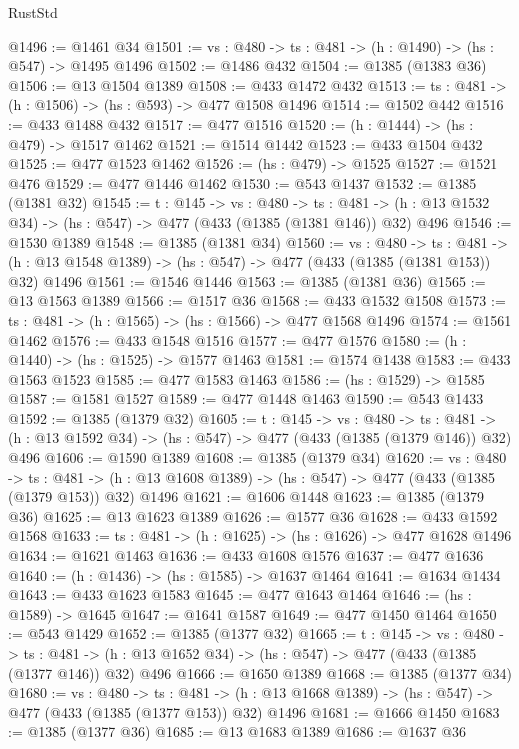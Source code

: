 \begin{lexlean}{RustStd}
\begin{coremodule}
{\begin{coremodule}
{{{{{{{@1496 := @1461 @34
@1501 := {vs : @480} -> {ts : @481} -> (h : @1490) -> (hs : @547) -> @1495 @1496
@1502 := @1486 @432
@1504 := @1385 (@1383 @36)
@1506 := @13 @1504 @1389
@1508 := @433 @1472 @432
@1513 := {ts : @481} -> (h : @1506) -> (hs : @593) -> @477 @1508 @1496
@1514 := @1502 @442
@1516 := @433 @1488 @432
@1517 := @477 @1516
@1520 := (h : @1444) -> (hs : @479) -> @1517 @1462
@1521 := @1514 @1442
@1523 := @433 @1504 @432
@1525 := @477 @1523 @1462
@1526 := (hs : @479) -> @1525
@1527 := @1521 @476
@1529 := @477 @1446 @1462
@1530 := @543 @1437
@1532 := @1385 (@1381 @32)
@1545 := {t : @145} ->
  {vs : @480} ->
  {ts : @481} -> (h : @13 @1532 @34) -> (hs : @547) -> @477 (@433 (@1385 (@1381 @146)) @32) @496
@1546 := @1530 @1389
@1548 := @1385 (@1381 @34)
@1560 := {vs : @480} ->
  {ts : @481} -> (h : @13 @1548 @1389) -> (hs : @547) -> @477 (@433 (@1385 (@1381 @153)) @32) @1496
@1561 := @1546 @1446
@1563 := @1385 (@1381 @36)
@1565 := @13 @1563 @1389
@1566 := @1517 @36
@1568 := @433 @1532 @1508
@1573 := {ts : @481} -> (h : @1565) -> (hs : @1566) -> @477 @1568 @1496
@1574 := @1561 @1462
@1576 := @433 @1548 @1516
@1577 := @477 @1576
@1580 := (h : @1440) -> (hs : @1525) -> @1577 @1463
@1581 := @1574 @1438
@1583 := @433 @1563 @1523
@1585 := @477 @1583 @1463
@1586 := (hs : @1529) -> @1585
@1587 := @1581 @1527
@1589 := @477 @1448 @1463
@1590 := @543 @1433
@1592 := @1385 (@1379 @32)
@1605 := {t : @145} ->
  {vs : @480} ->
  {ts : @481} -> (h : @13 @1592 @34) -> (hs : @547) -> @477 (@433 (@1385 (@1379 @146)) @32) @496
@1606 := @1590 @1389
@1608 := @1385 (@1379 @34)
@1620 := {vs : @480} ->
  {ts : @481} -> (h : @13 @1608 @1389) -> (hs : @547) -> @477 (@433 (@1385 (@1379 @153)) @32) @1496
@1621 := @1606 @1448
@1623 := @1385 (@1379 @36)
@1625 := @13 @1623 @1389
@1626 := @1577 @36
@1628 := @433 @1592 @1568
@1633 := {ts : @481} -> (h : @1625) -> (hs : @1626) -> @477 @1628 @1496
@1634 := @1621 @1463
@1636 := @433 @1608 @1576
@1637 := @477 @1636
@1640 := (h : @1436) -> (hs : @1585) -> @1637 @1464
@1641 := @1634 @1434
@1643 := @433 @1623 @1583
@1645 := @477 @1643 @1464
@1646 := (hs : @1589) -> @1645
@1647 := @1641 @1587
@1649 := @477 @1450 @1464
@1650 := @543 @1429
@1652 := @1385 (@1377 @32)
@1665 := {t : @145} ->
  {vs : @480} ->
  {ts : @481} -> (h : @13 @1652 @34) -> (hs : @547) -> @477 (@433 (@1385 (@1377 @146)) @32) @496
@1666 := @1650 @1389
@1668 := @1385 (@1377 @34)
@1680 := {vs : @480} ->
  {ts : @481} -> (h : @13 @1668 @1389) -> (hs : @547) -> @477 (@433 (@1385 (@1377 @153)) @32) @1496
@1681 := @1666 @1450
@1683 := @1385 (@1377 @36)
@1685 := @13 @1683 @1389
@1686 := @1637 @36
}}}}}}}
\end{coremodule}}
\end{coremodule}
\end{lexlean}

